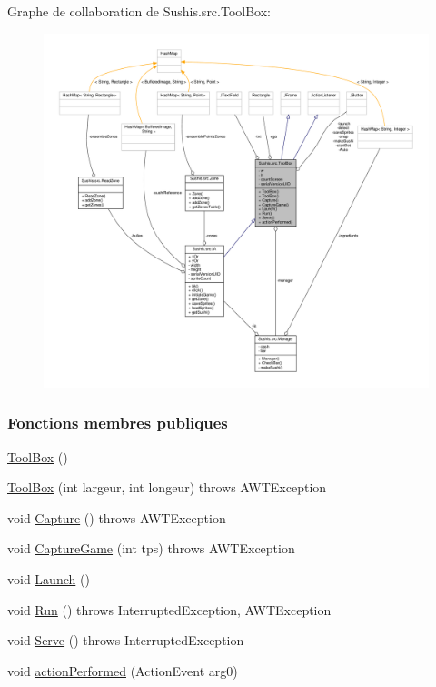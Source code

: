 Graphe de collaboration de Sushis.\+src.\+Tool\+Box\+:\nopagebreak
\begin{figure}[H]
\begin{center}
\leavevmode
\includegraphics[width=350pt]{classSushis_1_1src_1_1ToolBox__coll__graph}
\end{center}
\end{figure}
\subsubsection*{Fonctions membres publiques}
\begin{DoxyCompactItemize}
\item 
\hyperlink{classSushis_1_1src_1_1ToolBox_af533ef03ee45e6e524652341af2e7eda}{Tool\+Box} ()
\item 
\hyperlink{classSushis_1_1src_1_1ToolBox_aa26d4e4aac3026dad8b6d2113d5a1df3}{Tool\+Box} (int largeur, int longeur)  throws A\+W\+T\+Exception 
\item 
void \hyperlink{classSushis_1_1src_1_1ToolBox_ade4282ccb35c18dd7cd473c680145b86}{Capture} ()  throws A\+W\+T\+Exception 
\item 
void \hyperlink{classSushis_1_1src_1_1ToolBox_a85ac3d5ce3aa8a7a3691f6dbbc000aed}{Capture\+Game} (int tps)  throws A\+W\+T\+Exception 
\item 
void \hyperlink{classSushis_1_1src_1_1ToolBox_afac5ed37e5905a6409a375e5ad2000b2}{Launch} ()
\item 
void \hyperlink{classSushis_1_1src_1_1ToolBox_a2542efab6381677391dfe6407c0db0f7}{Run} ()  throws Interrupted\+Exception, A\+W\+T\+Exception 
\item 
void \hyperlink{classSushis_1_1src_1_1ToolBox_adad53308af901ed75c8ddd16e7069e6d}{Serve} ()  throws Interrupted\+Exception 
\item 
void \hyperlink{classSushis_1_1src_1_1ToolBox_a5c3c1e9751ac4cd49965024ae0485e56}{action\+Performed} (Action\+Event arg0)
\end{DoxyCompactItemize}
